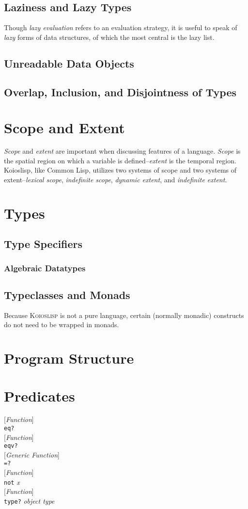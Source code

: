 \documentclass[10pt]{book}
\newenvironment{defother}[2]{[\textit{#1}]\\\texttt{#2}}{\\}
\newenvironment{defun}[1]{\begin{defother}{Function}{#1}}{\end{defother}}
\newenvironment{defgeneric}[1]{\begin{defother}{Generic Function}{#1}}{\end{defother}}
\begin{document}
\section{Laziness and Lazy Types}
Though \textit{lazy evaluation} refers to an evaluation strategy, it is useful to speak of \textit{lazy} forms of data structures, of which the most central is the lazy list. 
\section{Unreadable Data Objects}
\section{Overlap, Inclusion, and Disjointness of Types}
\chapter{Scope and Extent}
\textit{Scope} and \textit{extent} are important when discussing features of a language. \textit{Scope} is the spatial region on which a variable is defined--\textit{extent} is the temporal region. Koioslisp, like Common Lisp, utilizes two systems of scope and two systems of extent--\textit{lexical scope}, \textit{indefinite scope}, \textit{dynamic extent}, and \textit{indefinite extent}.
\chapter{Types}
\section{Type Specifiers}
\subsection{Algebraic Datatypes}
\section{Typeclasses and Monads}
Because \textsc{Koioslisp} is not a pure language, certain (normally monadic) constructs do not need to be wrapped in monads.
\chapter{Program Structure}
\chapter{Predicates}
\begin{defun}{eq?}\end{defun}
\begin{defun}{eqv?}\end{defun}
\begin{defgeneric}{=?}\end{defgeneric} %
\begin{defun}{not} \textit{x}\end{defun}
\begin{defun}{type?} \textit{object type}\end{defun} %
\end{document}
